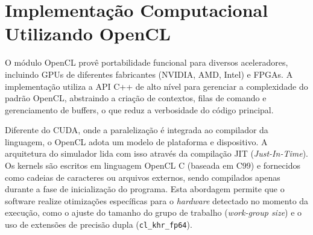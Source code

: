 
\section{Implementação Computacional Utilizando OpenCL}\label{sec:implementacao-computacional-utilizando-opencl}

O módulo OpenCL provê portabilidade funcional para diversos aceleradores, incluindo GPUs de diferentes fabricantes (NVIDIA, AMD, Intel) e FPGAs.
A implementação utiliza a API C++ de alto nível para gerenciar a complexidade do padrão OpenCL, abstraindo a criação de contextos, filas de comando e gerenciamento de buffers, o que reduz a verbosidade do código principal.

Diferente do CUDA, onde a paralelização é integrada ao compilador da linguagem, o OpenCL adota um modelo de plataforma e dispositivo.
A arquitetura do simulador lida com isso através da compilação JIT (\textit{Just-In-Time}). Os kernels são escritos em linguagem OpenCL C (baseada em C99) e fornecidos como cadeias de caracteres ou arquivos externos, sendo compilados apenas durante a fase de inicialização do programa.
Esta abordagem permite que o software realize otimizações específicas para o \textit{hardware} detectado no momento da execução, como o ajuste do tamanho do grupo de trabalho (\textit{work-group size}) e o uso de extensões de precisão dupla (\texttt{cl\_khr\_fp64}).

